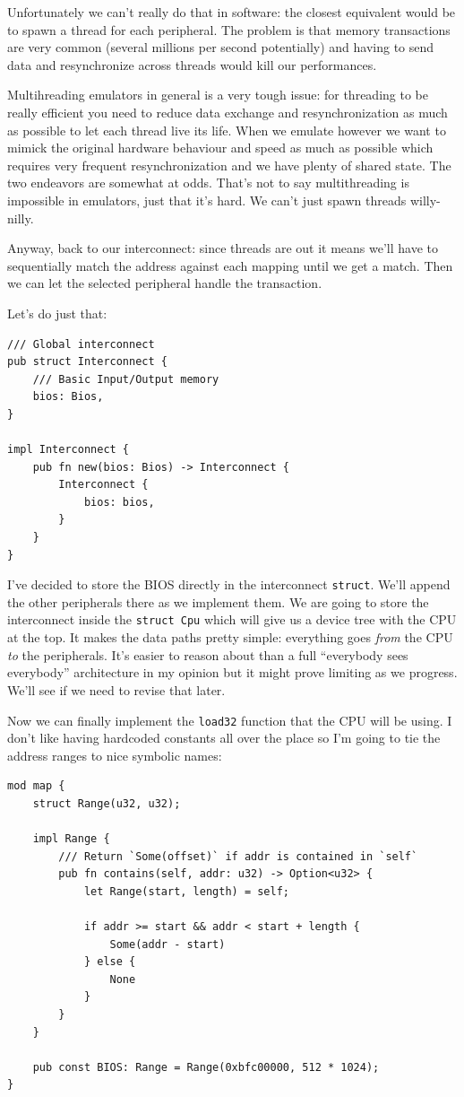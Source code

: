 \documentclass[a4paper]{article}
\newcommand{\code}[1] {\texttt{#1}}
\begin{document}
Unfortunately we can't really do that in software: the closest
equivalent would be to spawn a thread for each peripheral. The problem
is that memory transactions are very common (several millions per
second potentially) and having to send data and resynchronize across
threads would kill our performances.

Multihreading emulators in general is a very tough issue: for
threading to be really efficient you need to reduce data exchange and
resynchronization as much as possible to let each thread live its
life. When we emulate however we want to mimick the original hardware
behaviour and speed as much as possible which requires very frequent
resynchronization and we have plenty of shared state. The two
endeavors are somewhat at odds. That's not to say multithreading is
impossible in emulators, just that it's hard. We can't just spawn
threads willy-nilly.

Anyway, back to our interconnect: since threads are out it means we'll
have to sequentially match the address against each mapping until we
get a match. Then we can let the selected peripheral handle the
transaction.

Let's do just that:

\begin{lstlisting}
/// Global interconnect
pub struct Interconnect {
    /// Basic Input/Output memory
    bios: Bios,
}

impl Interconnect {
    pub fn new(bios: Bios) -> Interconnect {
        Interconnect {
            bios: bios,
        }
    }
}
\end{lstlisting}

I've decided to store the BIOS directly in the interconnect
\code{struct}. We'll append the other peripherals there as we
implement them. We are going to store the interconnect inside the
\code{struct Cpu} which will give us a device tree with the CPU at
the top. It makes the data paths pretty simple: everything goes \emph{from}
the CPU \emph{to} the peripherals. It's easier to reason about than a full
``everybody sees everybody'' architecture in my opinion but it might
prove limiting as we progress. We'll see if we need to revise that
later.

Now we can finally implement the \code{load32} function that the CPU
will be using. I don't like having hardcoded constants all over the
place so I'm going to tie the address ranges to nice symbolic names:

\begin{lstlisting}
mod map {
    struct Range(u32, u32);

    impl Range {
        /// Return `Some(offset)` if addr is contained in `self`
        pub fn contains(self, addr: u32) -> Option<u32> {
            let Range(start, length) = self;

            if addr >= start && addr < start + length {
                Some(addr - start)
            } else {
                None
            }
        }
    }

    pub const BIOS: Range = Range(0xbfc00000, 512 * 1024);
}
\end{lstlisting}
\end{document}
